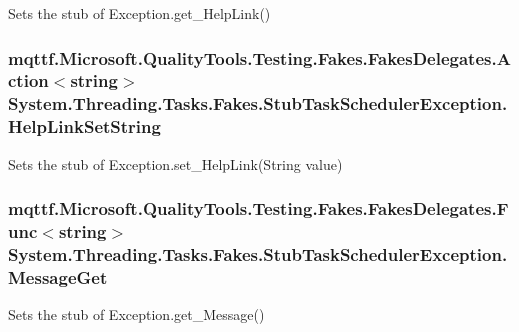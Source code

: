Sets the stub of Exception.\-get\-\_\-\-Help\-Link()

\hypertarget{class_system_1_1_threading_1_1_tasks_1_1_fakes_1_1_stub_task_scheduler_exception_a0ccdb259d6bcdb6c275a962ba5d1bbd8}{
\subsubsection[{Help\-Link\-Set\-String}]{\setlength{\rightskip}{0pt plus 5cm}mqttf.\-Microsoft.\-Quality\-Tools.\-Testing.\-Fakes.\-Fakes\-Delegates.\-Action$<$string$>$ System.\-Threading.\-Tasks.\-Fakes.\-Stub\-Task\-Scheduler\-Exception.\-Help\-Link\-Set\-String}}\label{class_system_1_1_threading_1_1_tasks_1_1_fakes_1_1_stub_task_scheduler_exception_a0ccdb259d6bcdb6c275a962ba5d1bbd8}


Sets the stub of Exception.\-set\-\_\-\-Help\-Link(\-String value)

\hypertarget{class_system_1_1_threading_1_1_tasks_1_1_fakes_1_1_stub_task_scheduler_exception_a89adffea8ce37a5f91d7d0b91d943701}{
\subsubsection[{Message\-Get}]{\setlength{\rightskip}{0pt plus 5cm}mqttf.\-Microsoft.\-Quality\-Tools.\-Testing.\-Fakes.\-Fakes\-Delegates.\-Func$<$string$>$ System.\-Threading.\-Tasks.\-Fakes.\-Stub\-Task\-Scheduler\-Exception.\-Message\-Get}}\label{class_system_1_1_threading_1_1_tasks_1_1_fakes_1_1_stub_task_scheduler_exception_a89adffea8ce37a5f91d7d0b91d943701}


Sets the stub of Exception.\-get\-\_\-\-Message()

